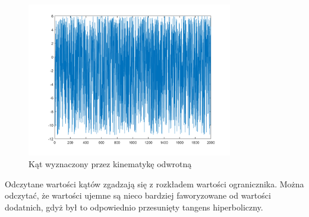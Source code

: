 \documentclass[a4paper, 12pt]{report}
\begin{document}
				\begin{figure}[H]
					\centering
					\includegraphics[width = 0.8\textwidth]{./AP/img/random_both_in_3.png}
					\caption{Kąt wyznaczony przez kinematykę odwrotną}
				\end{figure}
				\noindent Odczytane wartości kątów zgadzają się z rozkładem wartości ogranicznika. Można odczytać, że wartości ujemne są nieco bardziej faworyzowane od wartości dodatnich, gdyż był to odpowiednio przesunięty tangens hiperboliczny.
			\newpage
\end{document}
